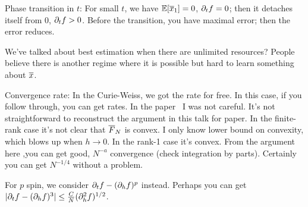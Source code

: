 Phase transition in $t$: For small $t$, we have $\mathbb{E}[\overline{x}_1]=0$, $\partial_t f=0$; then it detaches itself from 0, $\partial_t f>0$.
Before the transition, you have maximal error; then the error reduces.

We've talked about best estimation when there are unlimited resources? People believe there is another regime where it is possible but hard to learn something about $\overline{x}$.

Convergence rate: In the Curie-Weiss, we got the rate for free. In this case, if you follow through, you can get rates. In the paper~\cite{mourrat2019hamilton} I was not careful. %
It's not straightforward to reconstruct the argument in this talk for paper. In the finite-rank case it's not clear that $\overline{F}_N$ is convex. I only know lower bound on convexity, %
which blows up when $h\to 0$. In the rank-1 case it's convex. From the argument here ,you can get good, $N^{-a}$ convergence (check integration by parts). Certainly you can get $N^{-1/4}$ without a problem. 

For $p$ spin, we consider $\partial_t f - (\partial_h f)^p$ instead. Perhaps you can get $|\partial_t f-(\partial_h f)^3|\le \frac{C}{N} (\partial_h^2 f)^{1/2}$. 



